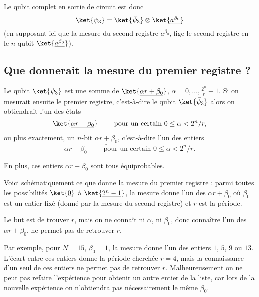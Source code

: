 \documentclass[11pt,class=report,crop=false]{standalone}
\begin{document}
Le qubit complet en sortie de circuit est donc 
$$\ket{\psi_3} = \ket{\bar \psi_3} \otimes \ket{ \underline{a^{\beta_0}} }$$
(en supposant ici que la mesure du second registre $\underline{a^{\beta_0}}$, fige le second registre en le $n$-qubit $\ket{ \underline{a^{\beta_0}} }$).

 
\subsection{Que donnerait la mesure du premier registre ?}


Le qubit $\ket{\psi_3}$ est une somme de $\ket{\underline{\alpha r + \beta_0}}$, $\alpha=0,\ldots, \frac{2^n}{r}-1$.
Si on mesurait ensuite le premier registre, c'est-à-dire le qubit $\ket{\bar \psi_3}$ alors on obtiendrait l'un des états 
$$\ket{\underline{\alpha r + \beta_0}} \qquad \text{ pour un certain } 0 \le \alpha < 2^n/r,$$
ou plus exactement, un $n$-bit $\underline{\alpha r + \beta_0}$, c'est-à-dire l'un des entiers 
$$\alpha r + \beta_0 \qquad \text{ pour un certain } 0 \le \alpha < 2^n/r.$$

En plus, ces entiers $\alpha r + \beta_0$ sont tous équiprobables.

Voici schématiquement ce que donne la mesure du premier registre : parmi toutes les possibilités $\ket{\underline{0}}$ à $\ket{\underline{2^n-1}}$, la mesure donne l'un des 
$\alpha r + \beta_0$ où $\beta_0$ est un entier fixé (donné par la mesure du second registre) et $r$ est la période.


Le but est de trouver $r$, mais on ne connaît ni $\alpha$, ni $\beta_0$, donc connaître 
l'un des $\alpha r + \beta_0$, ne permet pas de retrouver $r$.

Par exemple, pour $N=15$, $\beta_0=1$, la mesure donne l'un des entiers $1$, $5$, $9$ ou $13$. 
L'écart entre ces entiers donne la période cherchée $r=4$, mais la connaissance d'un seul de ces entiers ne permet pas de retrouver $r$. 
Malheureusement on ne peut pas refaire l'expérience pour obtenir un autre entier de la liste, car lors de la nouvelle expérience on n'obtiendra pas nécessairement le même $\beta_0$.

\end{document}
